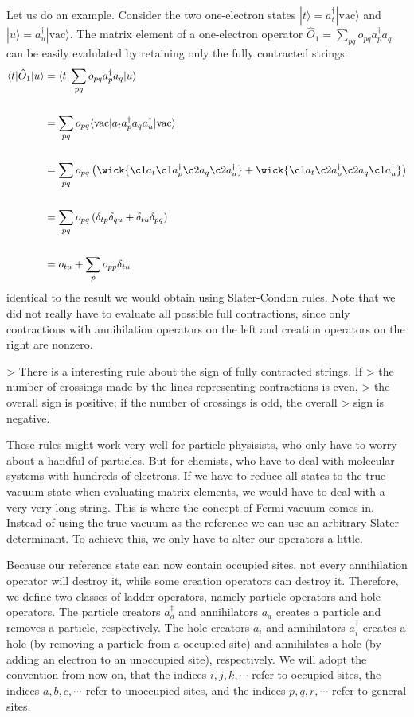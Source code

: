 \documentclass{article}
\begin{document}
Let us do an example. Consider the two one-electron states
$| t \rangle = a_t^\dagger | \mathrm{vac} \rangle$ and
$| u \rangle = a_u^\dagger | \mathrm{vac} \rangle$. The matrix
element of a one-electron operator
$\hat{O}_1 = \sum_{pq} o_{pq} a_p^\dagger a_q$ can be
easily evalulated by retaining only the fully contracted strings:
$$
	\begin{aligned}
		\langle t | \hat{O}_1 | u \rangle
		 & = \langle t | \sum_{pq} o_{pq} a_p^\dagger a_q | u \rangle                                       \\\\
		 & = \sum_{pq} o_{pq} \langle \mathrm{vac} | a_t a_p^\dagger a_q a_u^\dagger | \mathrm{vac} \rangle \\\\
		 & = \sum_{pq} o_{pq} \left( \wick{\c1 a_t \c1 a_p^\dagger \c2 a_q \c2 a_u^\dagger} +
		\wick{\c1 a_t \c2 a_p^\dagger \c2 a_q \c1 a_u^\dagger} \right)                                      \\\\
		 & = \sum_{pq} o_{pq} \left( \delta_{tp} \delta_{qu} + \delta_{tu} \delta_{pq} \right)              \\\\
		 & = o_{tu} + \sum_p o_{pp} \delta_{tu}
	\end{aligned}
$$
identical to the result we would obtain using Slater-Condon rules. Note that
we did not really have to evaluate all possible full contractions, since only
contractions with annihilation operators on the left and creation operators on
the right are nonzero.

> There is a interesting rule about the sign of fully contracted strings. If
> the number of crossings made by the lines representing contractions is even,
> the overall sign is positive; if the number of crossings is odd, the overall
> sign is negative.

These rules might work very well for particle physisists, who only have to
worry about a handful of particles. But for chemists, who have to deal with
molecular systems with hundreds of electrons. If we have to reduce all
states to the true vacuum state when evaluating matrix elements, we would
have to deal with a very very long string. This is where the concept of
Fermi vacuum comes in. Instead of using the true vacuum as the reference
we can use an arbitrary Slater determinant. To achieve this, we only have
to alter our operators a little.

Because our reference state can now contain occupied sites, not every
annihilation operator will destroy it, while some creation operators can
destroy it. Therefore, we define two classes of ladder operators, namely
particle operators and hole operators. The particle creators $a_a^\dagger$
and annihilators $a_a$ creates a particle and removes a particle,
respectively. The hole creators $a_i$ and annihilators $a_i^\dagger$ creates
a hole (by removing a particle from a occupied site) and annihilates a hole
(by adding an electron to an unoccupied site), respectively. We will adopt
the convention from now on, that the indices $i, j, k, \cdots$ refer to
occupied sites, the indices $a, b, c, \cdots$ refer to unoccupied sites, and
the indices $p, q, r, \cdots$ refer to general sites.
\end{document}
